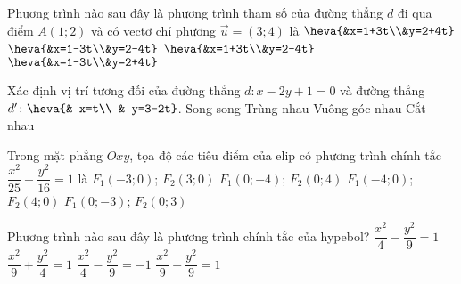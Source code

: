 \begin{ex}
	Phương trình nào sau đây là phương trình tham số của đường thẳng $d$ đi qua điểm $A(1;2)$ và có vectơ chỉ phương $\overrightarrow{u}=(3;4)$ là
	\choice
	{$\heva{&x=1+3t\\&y=2+4t}$}
	{$\heva{&x=1-3t\\&y=2-4t}$}
	{\True $\heva{&x=1+3t\\&y=2-4t}$}
	{$\heva{&x=1-3t\\&y=2+4t}$}
\end{ex}

\begin{ex}%
	Xác định vị trí tương đối của đường thẳng
	$d \colon x-2y+1=0$ và đường thẳng $d' \colon \heva{& x=t\\ & y=3-2t}$.
	\choice
	{Song song}
	{Trùng nhau}
	{\True Vuông góc nhau}
	{Cắt nhau}
\end{ex}


\begin{ex}%
	Trong mặt phẳng $O x y$, tọa độ các tiêu điểm của elip có phương trình chính tắc $\dfrac{x^2}{25}+\dfrac{y^2}{16}=1$ là
	\choice
	{\True $F_1(-3 ; 0)$; $F_2(3 ; 0)$}
	{$F_1(0 ;-4)$; $F_2(0 ; 4)$}
	{$F_1(-4 ; 0)$; $F_2(4 ; 0)$}
	{$F_1(0 ;-3)$; $F_2(0 ; 3)$}
\end{ex}

\begin{ex}%
	Phương trình nào sau đây là phương trình chính tắc của hypebol?
	\choice
	{\True $\dfrac{x^2}{4}-\dfrac{y^2}{9}=1$}
	{$\dfrac{x^2}{9}+\dfrac{y^2}{4}=1$}
	{$\dfrac{x^2}{4}-\dfrac{y^2}{9}=-1$}
	{$\dfrac{x^2}{9}+\dfrac{y^2}{9}=1$}
\end{ex}

